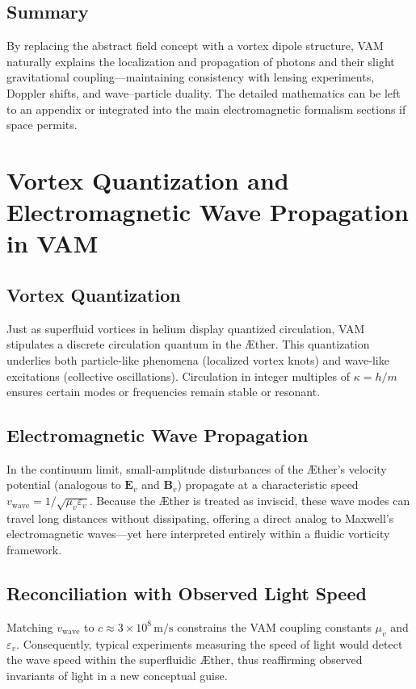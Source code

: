 \documentclass[aps,preprint,superscriptaddress]{revtex4-2}
\begin{document}
    \subsection{Summary}
    By replacing the abstract field concept with a vortex dipole structure, VAM naturally explains the localization and propagation of photons and their slight gravitational coupling—maintaining consistency with lensing experiments, Doppler shifts, and wave–particle duality. The detailed mathematics can be left to an appendix or integrated into the main electromagnetic formalism sections if space permits.

    \section{Vortex Quantization and Electromagnetic Wave Propagation in VAM}

    \subsection{Vortex Quantization}
    Just as superfluid vortices in helium display quantized circulation, VAM stipulates a discrete circulation quantum in the Æther. This quantization underlies both particle-like phenomena (localized vortex knots) and wave-like excitations (collective oscillations). Circulation in integer multiples of \( \kappa = h/m \) ensures certain modes or frequencies remain stable or resonant.

    \subsection{Electromagnetic Wave Propagation}
    In the continuum limit, small-amplitude disturbances of the Æther’s velocity potential (analogous to \(\mathbf{E}_v\) and \(\mathbf{B}_v\)) propagate at a characteristic speed \(v_{\mathrm{wave}} = 1/\sqrt{\mu_v \varepsilon_v}\). Because the Æther is treated as inviscid, these wave modes can travel long distances without dissipating, offering a direct analog to Maxwell’s electromagnetic waves—yet here interpreted entirely within a fluidic vorticity framework.

    \subsection{Reconciliation with Observed Light Speed}
    Matching \(v_{\mathrm{wave}}\) to \(c \approx 3\times 10^8\,\mathrm{m/s}\) constrains the VAM coupling constants \(\mu_v\) and \(\varepsilon_v\). Consequently, typical experiments measuring the speed of light would detect the wave speed within the superfluidic Æther, thus reaffirming observed invariants of light in a new conceptual guise.
\end{document}
